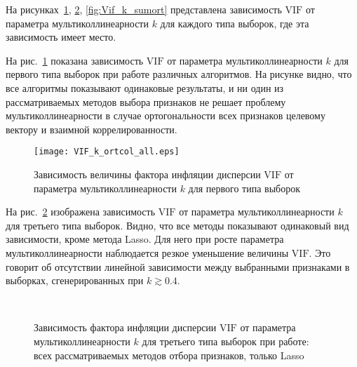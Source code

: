 \documentclass[a4paper,12pt]{article}
\newcommand{\vif}{\mathrm{VIF}}
\theoremstyle{plain}
\begin{document}
На рисунках~\ref{fig:Vif_k_ortcol}, \ref{fig:Vif_k_coltarget}, \ref{fig:Vif_k_sumort} представлена зависимость $\vif$ от параметра мультиколлинеарности $k$ для каждого типа выборок, где эта зависимость имеет место. 

На рис.~\ref{fig:Vif_k_ortcol} показана зависимость $\vif$ от параметра мультиколлинеарности $k$ для первого типа выборок при работе различных алгоритмов. На рисунке видно, что все алгоритмы показывают одинаковые результаты, и ни один из рассматриваемых методов выбора признаков не решает проблему мультиколлинеарности в случае ортогональности всех признаков целевому вектору и взаимной коррелированности.

\begin{figure}[!h]
\centering
\texttt{[image: VIF\_k\_ortcol\_all.eps]}
\caption{Зависимость величины фактора инфляции дисперсии $\vif$ от параметра мультиколлинеарности $k$ для первого типа выборок}
\label{fig:Vif_k_ortcol}
\end{figure} 

На рис.~\ref{fig:Vif_k_coltarget} изображена зависимость $\vif$ от параметра мультиколлинеарности $k$ для третьего типа выборок. Видно, что все методы показывают одинаковый вид зависимости, кроме метода Lasso. Для него при росте параметра мультиколлинеарности наблюдается резкое уменьшение величины $\vif$. Это говорит об отсутствии линейной зависимости между выбранными признаками в выборках, сгенерированных при $k \gtrsim 0.4$.

\begin{figure}[h]
\centering
{}
~
\caption{Зависимость фактора инфляции дисперсии $\vif$ от параметра мультиколлинеарности $k$ для третьего типа выборок при работе:~ всех рассматриваемых методов отбора признаков,  только Lasso}
\label{fig:Vif_k_coltarget}
\end{figure}
\end{document}
